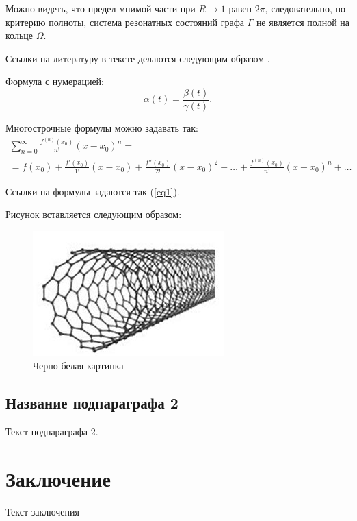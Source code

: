 \documentclass{nsart_eng}
\begin{document}
Можно видеть, что предел мнимой части при $R \to 1$ равен $2 \pi$, следовательно, по критерию полноты, система резонатных состояний графа $\Gamma$ не является полной на кольце $\Omega$.

Ссылки на литературу в тексте делаются следующим образом
\cite{1,4}.


Формула с нумерацией:
\begin{equation} \label{eq1}
\alpha (t) = \frac{ \beta (t)}{\gamma (t)}.
\end{equation}

Многострочные формулы можно задавать так:
\begin{multline} \label{eq2}
\sum\limits_{n=0}^\infty  {\frac{{f^{\left( n \right)} \left( {x_0 } \right)}}{{n!}}\left( {x - x_0 } \right)^n }  = \\
= f\left( {x_0 } \right) + \frac{{f'\left( {x_0 }
\right)}}{{1!}}\left( {x - x_0 } \right) +
 \frac{{f''\left( {x_0 } \right)}}{{2!}}\left( {x - x_0 } \right)^2 + \dots +
 \frac{{f^{\left( n \right)} \left( {x_0 } \right)}}{{n!}}\left( {x - x_0 } \right)^n  + \dots
\end{multline}

Ссылки на формулы задаются так  (\ref{eq1}).

Рисунок вставляется следующим образом:


\begin{figure}
\includegraphics{fig1.png}
\caption{Черно-белая картинка}
\end{figure}


\subsection{Название подпараграфа 2}
Текст подпараграфа 2.

\section{Заключение}
Текст заключения

\end{document}
